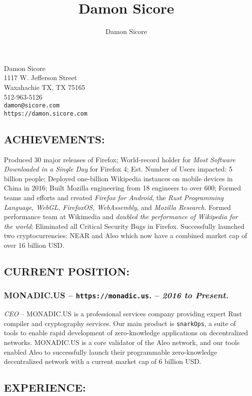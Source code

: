 \documentclass[10pt]{report}
\author{Damon Sicore}
\title{Damon Sicore}
\begin{document}
\begin{center}
\LARGE Damon Sicore \\
\normalsize
1117 W. Jefferson Street \\
Waxahachie TX, TX 75165 \\
512-963-5126\\
\texttt{damon@sicore.com}\\
\texttt{https://damon.sicore.com}\\
\end{center}

\subsection*{ACHIEVEMENTS:}  Produced 30 major releases of Firefox;
World-record holder for \emph{Most Software Downloaded in a Single Day} for
Firefox 4; Est.  Number of Users impacted: 5 billion people;  Deployed
one-billion Wikipedia instances on mobile devices in China in 2016; Built
Mozilla engineering from 18 engineers to over 600;  Formed teams and efforts
and created \emph{Firefox for Android}, the \emph{Rust Programming Language,
WebGL, FirefoxOS, WebAssembly}, and \emph{Mozilla Research}.  Formed
performance team at Wikimedia and \emph{doubled the performance of Wikipedia
for the world}; Eliminated all Critical Security Bugs in Firefox.  Successfully
launched two cryptocurrencies: NEAR and Aleo which now have a combined market
cap of over 16 billion USD.

\subsection*{CURRENT POSITION:}

\subsubsection*{MONADIC.US -- \texttt{https://monadic.us}. -- \emph{2016 to
Present. }} \emph{CEO} -- MONADIC.US is a professional services company
providing expert Rust compiler and cryptography services.  Our main product is
\texttt{snarkOps}, a suite of tools to enable rapid development of
zero-knowledge applications on decentralized networks.  MONADIC.US is a core
validator of the Aleo network, and our tools enabled Aleo to successfully
launch their programmable zero-knowledge decentralized network with a current
market cap of 6 billion USD.


\subsection*{EXPERIENCE:}
\end{document}

